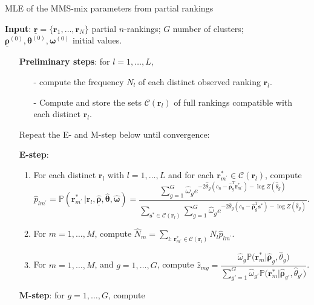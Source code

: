 \begin{algorithm}[h!]\small
\caption{MLE of the MMS-mix parameters from partial rankings}
\label{alg:partial_mixture}
\hspace*{\algorithmicindent} \textbf{Input}: $\underline{\bm{r}}=\{\bm{r}_1,\dots,\bm{r}_N\}$ partial $n$-rankings; $G$ number of clusters; $\underline{\bm{\rho}}^{(0)}, \bm{\theta}^{(0)}, \bm{\omega}^{(0)}$ initial values.
\begin{enumerate}
\item[] \textbf{Preliminary steps}: for $l=1,\dots,L$,
\begin{itemize}
    \item[-] compute the frequency $N_l$ of each distinct observed ranking $\bm{r}_l$.
    \item[-] Compute and store the sets $\mathcal{C}(\bm r_l)$ of full rankings compatible with each distinct $\bm{r}_l$.
\end{itemize} 
     \item[] Repeat the E- and M-step below until convergence:
    \item[] \textbf{E-step}:
    \begin{enumerate}
        \item For each distinct $\bm r_l$ with $l=1,\dots,L$ and for each $\bm{r}^*_{m^\prime}\in\mathcal{C}(\bm r_l)$, compute 
        \vspace{-1mm}
$$\hat{p}_{lm^\prime}=\mathbb{P}(\bm{r}^*_{m^\prime}\,|\bm{r}_l,\underline{\hat{\bm{\rho}}},{\hat{\bm\theta}},{\hat{\bm\omega}})
=\frac{\sum_{g=1}^G \hat\omega_g e^{-2\hat\theta_g\left(c_n-{\hat{\bm{\rho}}_g^T}\bm{r}^*_{m^\prime}\right)-\log Z\left(\hat\theta_g\right)}}{\sum_{\bm{s}^*\in \mathcal{C}(\bm{r}_l)}\sum_{g=1}^G \hat\omega_ge^{-2\hat\theta_g\left(c_n-\hat{\bm{\rho}}^T_{g}\bm{s}^*\right)-\log Z\left(\hat\theta_g\right)}}
.$$
\vspace{-3mm}
\item For $m=1,\dots,M$, compute
$
\hat{N}_m=\sum_{l:\,\bm{r}^*_{m^\prime}\in\mathcal{C}(\bm{r}_l)} N_l \hat{p}_{lm^\prime}
$.
\vspace{-3mm}
        \item For $m=1,\dots,M$, and $g=1,\dots,G$, compute
$\hat z_{mg}=\dfrac{\hat\omega_g\mathbb{P}\big(\bm{r}^*_m\big\vert\hat{\bm{\rho}}_g,\hat\theta_g\big)}{\sum_{g'=1}^G\hat\omega_{g'}\mathbb{P}\big(\bm{r}^*_m\big\vert\hat{\bm{\rho}}_{g'},\hat\theta_{g'}\big)}$.
\vspace{-3mm}
    \end{enumerate}   
    \item[] \textbf{M-step}: for $g=1,\dots,G$, compute

\end{enumerate}
\end{algorithm}
